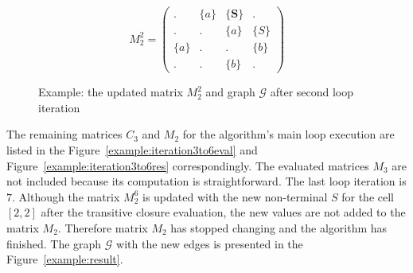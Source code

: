 \begin{figure}
    \begin{subfigure}[]{0.5\textwidth}
    \centering
    $$
    M_2^2 =
    \begin{pmatrix}
    .     & \{a\} & \{\textbf{S}\} & .     \\
    .     & .     & \{a\} & \{S\} \\
    \{a\} & .     & .     & \{b\} \\
    .     & .     & \{b\} & .
    \end{pmatrix}
    $$
    \end{subfigure}
    \begin{subfigure}[]{0.4\textwidth}
    \centering
    \end{subfigure}
    \caption{Example: the updated matrix $M_2^2$ and graph $\mathcal{G}$ after second loop iteration}
    \label{example:iteration2res}
\end{figure}

The remaining matrices $C_3$ and $M_2$ for the algorithm's main loop execution are listed in the Figure~\ref{example:iteration3to6eval} and Figure~\ref{example:iteration3to6res} correspondingly.
The evaluated matrices $M_3$ are not included because its computation is straightforward.
The last loop iteration is $7$.
Although the matrix $M_2^6$ is updated with the new non-terminal $S$ for the cell $[2,2]$ after the transitive closure evaluation, the new values are not added to the matrix $M_2$.
Therefore matrix $M_2$ has stopped changing and the algorithm has finished.
The graph $\mathcal{G}$ with the new edges is presented in the Figure~\ref{example:result}.

